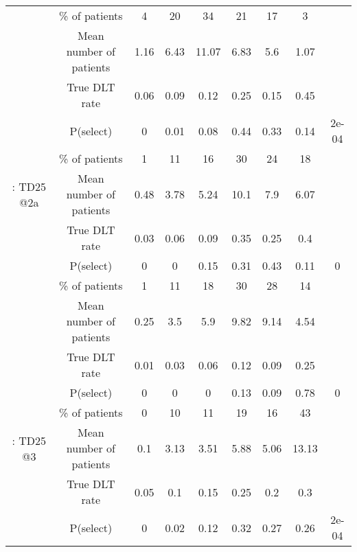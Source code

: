 \begin{table}[h!]
\begin{singlespace}
{\begin{tabular}[t]{ccccccccc}
				\rowcolor{gray!6}   & \% of patients & 4 & 20 & 34 & 21 & 17 & 3 & \\
				
				\rowcolor{gray!6}  \multirow{-4}{*}{\centering\arraybackslash 11: TD25 @1} & Mean number of patients & 1.16 & 6.43 & 11.07 & 6.83 & 5.6 & 1.07 & \\
				\cmidrule{1-9}
				& True DLT rate & 0.06 & 0.09 & 0.12 & 0.25 & 0.15 & 0.45 & \\
				
				& P(select) & 0 & 0.01 & 0.08 & 0.44 & 0.33 & 0.14 & 2e-04\\
				
				& \% of patients & 1 & 11 & 16 & 30 & 24 & 18 & \\
				
				\multirow{-4}{*}{\centering\arraybackslash 12: TD25 @2a} & Mean number of patients & 0.48 & 3.78 & 5.24 & 10.1 & 7.9 & 6.07 & \\
				\cmidrule{1-9}
				\rowcolor{gray!6}   & True DLT rate & 0.03 & 0.06 & 0.09 & 0.35 & 0.25 & 0.4 & \\
				
				\rowcolor{gray!6}   & P(select) & 0 & 0 & 0.15 & 0.31 & 0.43 & 0.11 & 0\\
				
				\rowcolor{gray!6}   & \% of patients & 1 & 11 & 18 & 30 & 28 & 14 & \\
				
				\rowcolor{gray!6}  \multirow{-4}{*}{\centering\arraybackslash 13: TD25 @2b} & Mean number of patients & 0.25 & 3.5 & 5.9 & 9.82 & 9.14 & 4.54 & \\
				\cmidrule{1-9}
				& True DLT rate & 0.01 & 0.03 & 0.06 & 0.12 & 0.09 & 0.25 & \\
				
				& P(select) & 0 & 0 & 0 & 0.13 & 0.09 & 0.78 & 0\\
				
				& \% of patients & 0 & 10 & 11 & 19 & 16 & 43 & \\
				
				\multirow{-4}{*}{\centering\arraybackslash 14: TD25 @3} & Mean number of patients & 0.1 & 3.13 & 3.51 & 5.88 & 5.06 & 13.13 & \\
				\cmidrule{1-9}
				\rowcolor{gray!6}   & True DLT rate & 0.05 & 0.1 & 0.15 & 0.25 & 0.2 & 0.3 & \\
				
				\rowcolor{gray!6}   & P(select) & 0 & 0.02 & 0.12 & 0.32 & 0.27 & 0.26 & 2e-04\\
				

\end{tabular}}
\end{singlespace}
\end{table}
